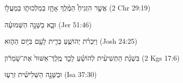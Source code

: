 
\begin{exe}

\ex\label{B_sim_exs1}
\texthebrew{
אֲשֶׁ֣ר הִזְנִיחַ֩ הַמֶּ֨לֶךְ אָחָ֧ז בְּמַלְכוּתֹ֛ו בְּמַעֲלֹ֖ו 
} (2 Chr 29:19)

\ex\label{B_sim_exs2}
\texthebrew{
וּבָ֧א בַשָּׁנָ֣ה הַשְּׁמוּעָ֗ה 
} (Jer 51:46)

\ex\label{B_sim_exs3}
\texthebrew{
וַיִּכְרֹ֨ת יְהֹושֻׁ֧עַ בְּרִ֛ית לָעָ֖ם בַּיֹּ֣ום הַה֑וּא 
} (Josh 24:25)

\ex\label{B_sim_exs4}
\texthebrew{
בִּשְׁנַ֨ת הַתְּשִׁיעִ֜ית לְהֹושֵׁ֗עַ לָכַ֤ד מֶֽלֶךְ־אַשּׁוּר֙ אֶת־שֹׁ֣מְרֹ֔ון 
} (2 Kgs 17:6)

\ex\label{B_sim_exs5}
\texthebrew{
וּבַשָּׁנָ֣ה הַשְּׁלִישִׁ֗ית זִרְע֧וּ 
} (Isa 37:30)

\end{exe}
